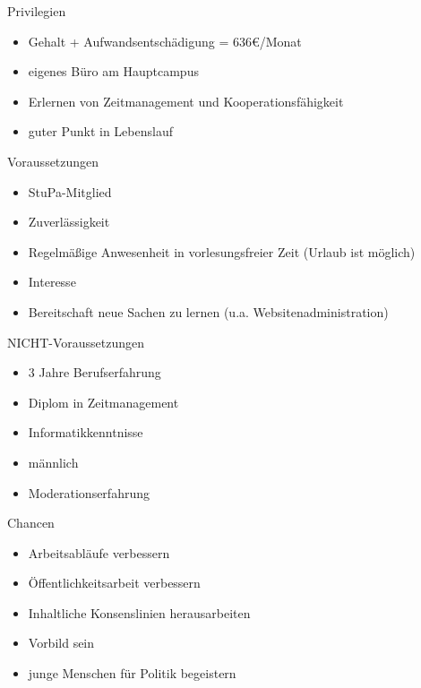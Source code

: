 \documentclass{beamer}
\begin{document}
\begin{frame}{Privilegien}
    \begin{itemize}
        \item Gehalt + Aufwandsentschädigung = 636€/Monat
        \item eigenes Büro am Hauptcampus
        \item Erlernen von Zeitmanagement und Kooperationsfähigkeit
        \item guter Punkt in Lebenslauf
    \end{itemize}
\end{frame}

\begin{frame}{Voraussetzungen}
    \begin{itemize}
        \item StuPa-Mitglied
        \item Zuverlässigkeit
        \item Regelmäßige Anwesenheit in vorlesungsfreier Zeit (Urlaub ist möglich)
        \item Interesse
        \item Bereitschaft neue Sachen zu lernen (u.a. Websitenadministration)
    \end{itemize}
\end{frame}

\begin{frame}{NICHT-Voraussetzungen}
    \begin{itemize}
        \item 3 Jahre Berufserfahrung
        \item Diplom in Zeitmanagement
        \item Informatikkenntnisse
        \item männlich
        \item Moderationserfahrung
    \end{itemize}
\end{frame}

\begin{frame}{Chancen}
    \begin{itemize}
        \item Arbeitsabläufe verbessern
        \item Öffentlichkeitsarbeit verbessern
        \item Inhaltliche Konsenslinien herausarbeiten
        \item Vorbild sein
        \item junge Menschen für Politik begeistern
    \end{itemize}
\end{frame}
\end{document}
